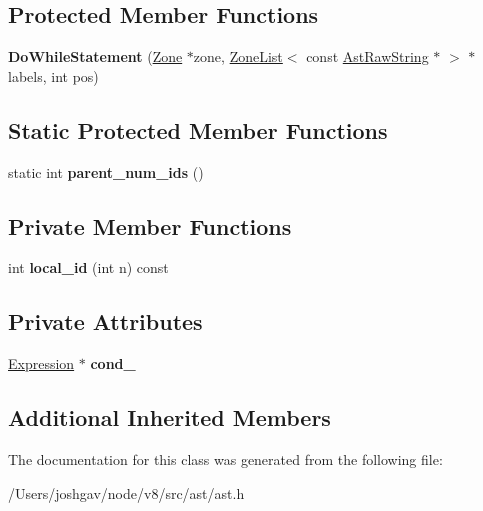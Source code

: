 \subsection*{Protected Member Functions}
\begin{DoxyCompactItemize}
\item 
{\bfseries Do\+While\+Statement} (\hyperlink{classv8_1_1internal_1_1_zone}{Zone} $\ast$zone, \hyperlink{classv8_1_1internal_1_1_zone_list}{Zone\+List}$<$ const \hyperlink{classv8_1_1internal_1_1_ast_raw_string}{Ast\+Raw\+String} $\ast$ $>$ $\ast$labels, int pos)\hypertarget{classv8_1_1internal_1_1_do_while_statement_a0ea3566f774d111a9ba1c01099d6f93d}{}\label{classv8_1_1internal_1_1_do_while_statement_a0ea3566f774d111a9ba1c01099d6f93d}

\end{DoxyCompactItemize}
\subsection*{Static Protected Member Functions}
\begin{DoxyCompactItemize}
\item 
static int {\bfseries parent\+\_\+num\+\_\+ids} ()\hypertarget{classv8_1_1internal_1_1_do_while_statement_a92e37271eeafb89fa1a2341b60e22dbe}{}\label{classv8_1_1internal_1_1_do_while_statement_a92e37271eeafb89fa1a2341b60e22dbe}

\end{DoxyCompactItemize}
\subsection*{Private Member Functions}
\begin{DoxyCompactItemize}
\item 
int {\bfseries local\+\_\+id} (int n) const \hypertarget{classv8_1_1internal_1_1_do_while_statement_a9580c3ecdd90b350f853803e504fec2f}{}\label{classv8_1_1internal_1_1_do_while_statement_a9580c3ecdd90b350f853803e504fec2f}

\end{DoxyCompactItemize}
\subsection*{Private Attributes}
\begin{DoxyCompactItemize}
\item 
\hyperlink{classv8_1_1internal_1_1_expression}{Expression} $\ast$ {\bfseries cond\+\_\+}\hypertarget{classv8_1_1internal_1_1_do_while_statement_a043a7b99821cb3e8e70beca15cbef72a}{}\label{classv8_1_1internal_1_1_do_while_statement_a043a7b99821cb3e8e70beca15cbef72a}

\end{DoxyCompactItemize}
\subsection*{Additional Inherited Members}


The documentation for this class was generated from the following file\+:\begin{DoxyCompactItemize}
\item 
/\+Users/joshgav/node/v8/src/ast/ast.\+h\end{DoxyCompactItemize}
